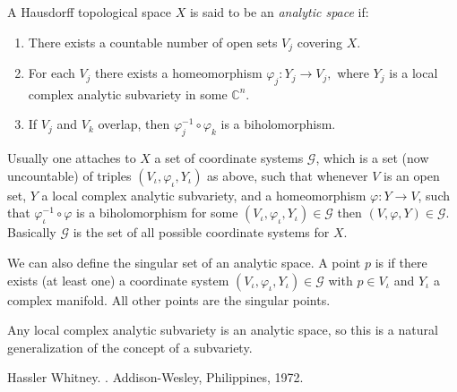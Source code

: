 \documentclass[12pt]{article}
\theoremstyle{theorem}
\theoremstyle{definition}
\theoremstyle{remark}
\begin{document}
A Hausdorff topological space $X$ is said to be an {\em analytic space} if:
\begin{enumerate}
\item There exists a countable number of open sets $V_j$ covering $X.$
\item For each $V_j$ there exists a homeomorphism $\varphi_j \colon Y_j \to V_j ,$
 where $Y_j$ is a local complex analytic subvariety in some ${\mathbb{C}}^n .$
\item If $V_j$ and $V_k$ overlap, then $\varphi_j^{-1} \circ \varphi_k$ is a biholomorphism.
\end{enumerate}

Usually one attaches to $X$ a set of coordinate systems $\mathcal{G}$, which is a set (now uncountable)
of triples $(V_\iota,\varphi_\iota,Y_\iota)$ as above, such that whenever $V$ is an open set, $Y$
a local complex analytic subvariety, and a homeomorphism $\varphi \colon Y \to V$, such that
$\varphi_\iota^{-1} \circ \varphi$ is a biholomorphism for some  $(V_\iota,\varphi_\iota,Y_\iota) \in \mathcal{G}$
then $(V,\varphi,Y) \in \mathcal{G} .$  Basically $\mathcal{G}$ is the set of all possible coordinate systems
for $X$.

We can also define the singular set of an analytic space.  A point $p$ is
if there exists (at least one) a coordinate system $(V_\iota,\varphi_\iota,Y_\iota) \in \mathcal{G}$ with $p \in V_\iota$
and $Y_\iota$ a complex manifold.  All other points are the singular points.

Any local complex analytic subvariety is an analytic space, so this is a natural generalization of the concept of a subvariety.


\begin{thebibliography}{9}
Hassler Whitney.
{\em {}}.
Addison-Wesley, Philippines, 1972.
\end{thebibliography}
\end{document}
